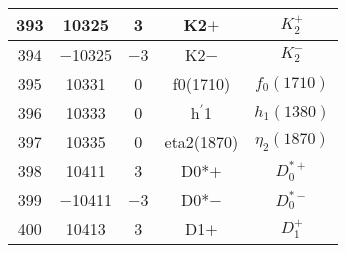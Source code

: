 \documentclass{article}
\begin{document}
\begin{table}[!htbp]
\begin{tabular}{|c|c|c|c|c|}
\hline
393 & 10325 & 3 & K\underline{\hspace{0.6em}}2$+$ & $K_2^+$ \\
\hline
394 & $-$10325 & $-$3 & K\underline{\hspace{0.6em}}2$-$ & $K_2^-$ \\
\hline
395 & 10331 & 0 & f\underline{\hspace{0.6em}}0(1710) & $f_{0}(1710)$ \\
\hline
396 & 10333 & 0 & h$^{\prime}$\underline{\hspace{0.6em}}1 & $h_{1}(1380)$ \\
\hline
397 & 10335 & 0 & eta2(1870) & $\eta_{2}(1870)$ \\
\hline
398 & 10411 & 3 & D\underline{\hspace{0.6em}}0*$+$ & $D_{0}^{*+}$ \\
\hline
399 & $-$10411 & $-$3 & D\underline{\hspace{0.6em}}0*$-$ & $D_{0}^{*-}$ \\
\hline
400 & 10413 & 3 & D\underline{\hspace{0.6em}}1$+$ & $D_{1}^{+}$ \\
\hline
\end{tabular}
\end{table}

\clearpage
\end{document}
